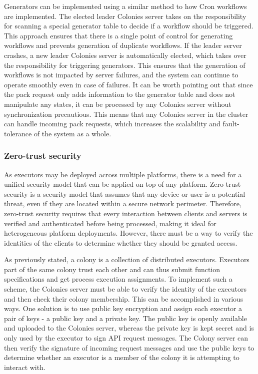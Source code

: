 \documentclass{article}
\begin{document}
Generators can be implemented using a similar method to how Cron workflows are implemented. The elected leader Colonies server takes on the responsibility for scanning a special generator table to decide if a workflow should be triggered. This approach ensures that there is a single point of control for generating workflows and prevents generation of duplicate workflows. If the leader server crashes, a new leader Colonies server is automatically elected, which takes over the responsibility for triggering generators. This ensures that the generation of workflows is not impacted by server failures, and the system can continue to operate smoothly even in case of failures. It can be worth pointing out that since the pack request only adds information to the generator table and does not manipulate any states, it can be processed by any Colonies server without synchronization precautious. This means that any Colonies server in the cluster can handle incoming pack requests, which increases the scalability and fault-tolerance of the system as a whole.

\subsubsection{Zero-trust security}
\label{zerotrustsecurity}
As executors may be deployed across multiple platforms, there is a need for a unified security model that can be applied on top of any platform. Zero-trust security \cite{zerotrust} is a security model that assumes that any device or user is a potential threat, even if they are located within a secure network perimeter. Therefore, zero-trust security requires that every interaction between clients and servers is verified and authenticated before being processed, making it ideal for heterogeneous platform deployments. However, there must be a way to verify the identities of the clients to determine whether they should be granted access.

As previously stated, a colony is a collection of distributed executors. Executors part of the same colony trust each other and can thus submit function specifications and get process execution assignments. To implement such a scheme, the Colonies server must be able to verify the identity of the executors and then check their colony membership. This can be accomplished in various ways. One solution is to use public key encryption and assign each executor a pair of keys - a public key and a private key. The public key is openly available and uploaded to the Colonies server, whereas the private key is kept secret and is only used by the executor to sign API request messages. The Colony server can then verify the signature of incoming request messages and use the public keys to determine whether an executor is a member of the colony it is attempting to interact with.
\end{document}
